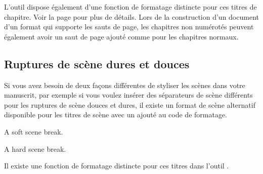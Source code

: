 \documentclass[a4paper,11pt,french]{sphinxmanual}
\begin{document}
\sphinxAtStartPar
L’outil  dispose également d’une fonction de formatage distincte pour ces titres de chapitre. Voir la page {\hyperref[\detokenize{project_manuscript:a-manuscript}]{}} pour plus de détails. Lors de la construction d’un document d’un format qui supporte les sauts de page, les chapitres non numérotés peuvent également avoir un saut de page ajouté comme pour les chapitres normaux.


\subsection{Ruptures de scène dures et douces}
\label{\detokenize{project_structure:hard-and-soft-scene-breaks}}\label{\detokenize{project_structure:a-struct-heads-scenes}}
\sphinxAtStartPar
Si vous avez besoin de deux façons différentes de styliser les scènes dans votre manuscrit, par exemple si vous voulez insérer des séparateurs de scène différents pour les ruptures de scène douces et dures, il existe un format de scène alternatif disponible pour les titres de scène avec un \sphinxtitleref{!} ajouté au code de formatage.

\begin{sphinxVerbatim}[commandchars=\\\{\}]

A soft scene break.


A hard scene break.
\end{sphinxVerbatim}

\sphinxAtStartPar
Il existe une fonction de formatage distincte pour ces titres dans l’outil .

\sphinxAtStartPar
{}

\sphinxstepscope
\end{document}
